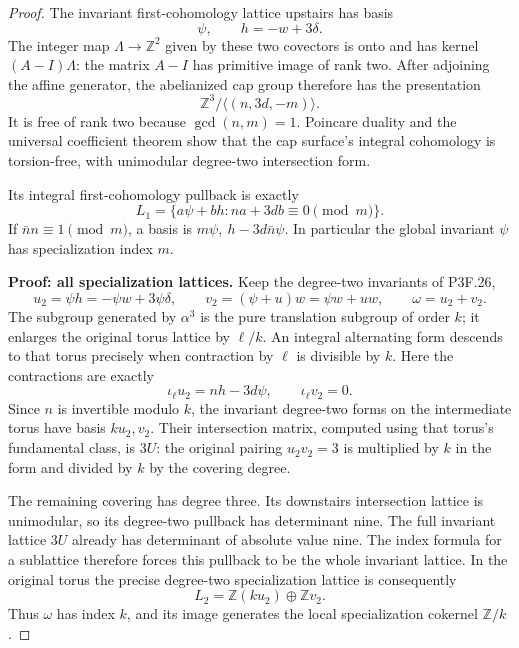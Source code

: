 \begin{proof}
The invariant first-cohomology lattice upstairs has basis \[
 \psi,\qquad h=-w+3\delta.
\] The integer map \(\Lambda\to\mathbb Z^2\) given by these two covectors is onto and has kernel \((A-I)\Lambda\): the matrix \(A-I\) has primitive image of rank two. After adjoining the affine generator, the abelianized cap group therefore has the presentation \[
 \mathbb Z^3/\langle(n,3d,-m)\rangle.
\] It is free of rank two because \(\gcd(n,m)=1\). Poincare duality and the universal coefficient theorem show that the cap surface's integral cohomology is torsion-free, with unimodular degree-two intersection form.

Its integral first-cohomology pullback is exactly \[
 L_1=\{a\psi+b h:na+3db\equiv0\pmod m\}.
\] If \(\bar n n\equiv1\pmod m\), a basis is \(m\psi,\ h-3d\bar n\psi\). In particular the global invariant \(\psi\) has specialization index \(m\).

\textbf{Proof: all specialization lattices.} Keep the degree-two invariants of P3F.26, \[
 u_2=\psi h=-\psi w+3\psi\delta,
 \qquad v_2=(\psi+u)w=\psi w+uw,
 \qquad\omega=u_2+v_2.
\] The subgroup generated by \(\alpha^3\) is the pure translation subgroup of order \(k\); it enlarges the original torus lattice by \(\ell/k\). An integral alternating form descends to that torus precisely when contraction by \(\ell\) is divisible by \(k\). Here the contractions are exactly \[
 \iota_\ell u_2=nh-3d\psi,
 \qquad \iota_\ell v_2=0.
\] Since \(n\) is invertible modulo \(k\), the invariant degree-two forms on the intermediate torus have basis \(ku_2,v_2\). Their intersection matrix, computed using that torus's fundamental class, is \(3U\): the original pairing \(u_2v_2=3\) is multiplied by \(k\) in the form and divided by \(k\) by the covering degree.

The remaining covering has degree three. Its downstairs intersection lattice is unimodular, so its degree-two pullback has determinant nine. The full invariant lattice \(3U\) already has determinant of absolute value nine. The index formula for a sublattice therefore forces this pullback to be the whole invariant lattice. In the original torus the precise degree-two specialization lattice is consequently \[
 L_2=\mathbb Z(ku_2)\oplus\mathbb Z v_2.
\] Thus \(\omega\) has index \(k\), and its image generates the local specialization cokernel \(\mathbb Z/k\).


\end{proof}
